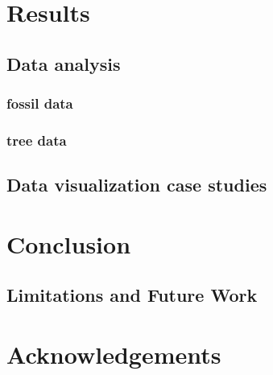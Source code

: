 \documentclass[11pt, a4paper,oneside,chapterprefix=false]{scrbook}
\begin{document}
\chapter{Results} \label{chp:results}
\section{Data analysis} \label{sec:result_data_analysis}
\subsection{fossil data} \label{subsec:data_analysis_fossil}
\subsection{tree data} \label{subsec:data_analysis_tree}

\section{Data visualization case studies} \label{sec:result_data_visualization}
\chapter{Conclusion} \label{chp:conclusion}



\section{Limitations and Future Work}

\chapter*{Acknowledgements}





\listoffigures
\listoftables
\end{document}
